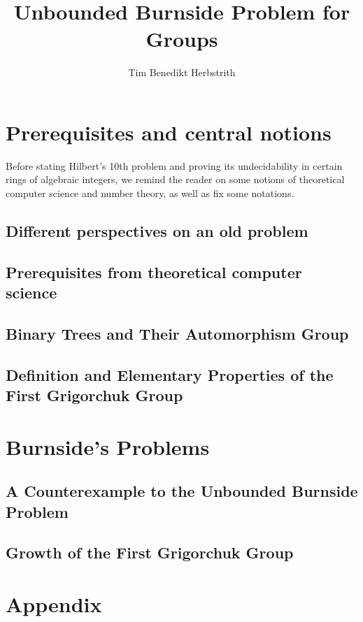 \documentclass[10pt,a4paper]{scrbook}
\author{Tim Benedikt Herbstrith}
\title{Unbounded Burnside Problem for Groups}
\numberwithin{equation}{section}
\begin{document}

\allowdisplaybreaks

\frontmatter



\mainmatter
\onehalfspacing

\chapter{Prerequisites and central notions}

Before stating Hilbert's 10th problem and proving its undecidability in
certain rings of algebraic integers, we remind the reader on some
notions of theoretical computer science and number theory, as well as
fix some notations.

\section{Different perspectives on an old problem}


\section{Prerequisites from theoretical computer science}


\section{Binary Trees and Their Automorphism Group}
%

\section{Definition and Elementary Properties of the First Grigorchuk Group}
%

\chapter{Burnside's Problems}
%

\section{A Counterexample to the Unbounded Burnside Problem}
%

\section{Growth of the First Grigorchuk Group}
%

\clearpage
\appendix
\chapter{Appendix}\label{sec:Appendix}
%

\backmatter
\vspace{\fill}
\printbibliography

\listoftodos
\end{document}
